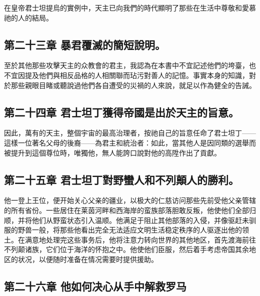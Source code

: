 在皇帝君士坦提烏的實例中，天主已向我們的時代顯明了那些在生活中尊敬和愛慕祂的人的結局。\par


\subsection{第二十三章 暴君覆滅的簡短說明。}

至於其他那些攻擊天主的众教會的君主，我認為在本書中不宜記述他們的垮臺，也不宜因提及他們與相反品格的人相關聯而玷污對善人的記憶。事實本身的知識，對於那些親眼目睹或聽說過他們各自遭受的災禍的人來說，就足以作為健全的告誡。\par


\subsection{第二十四章 君士坦丁獲得帝國是出於天主的旨意。}

因此，萬有的天主，整個宇宙的最高治理者，按祂自己的旨意任命了君士坦丁——這樣一位著名父母的後裔——為君主和統治者：如此，當其他人是因同類的選舉而被提升到這個尊位時，唯獨他，無人能誇口說對他的高陞作出了貢獻。\par


\subsection{第二十五章 君士坦丁對野蠻人和不列顛人的勝利。}

他一登上王位，便开始关心父亲的疆业，以极大的仁慈访问那些先前受他父亲管辖的所有省份。一些居住在莱茵河畔和西海岸的蛮族部落胆敢反叛，他使他们全部归顺，并将他们从野蛮状态引入温顺。他满足于阻止其他部落的入侵，并像驱赶未驯服的野兽一般，将那些他看出完全无法适应文明生活稳定秩序的人驱逐出他的领土。在满意地处理完这些事务后，他将注意力转向世界的其他地区，首先渡海前往不列颠诸族，它们位于海洋的怀抱之中。他使他们臣服，然后着手考虑帝国其余地区的状况，以便随时准备在情况需要时提供援助。\par


\subsection{第二十六章 他如何决心从手中解救罗马}

